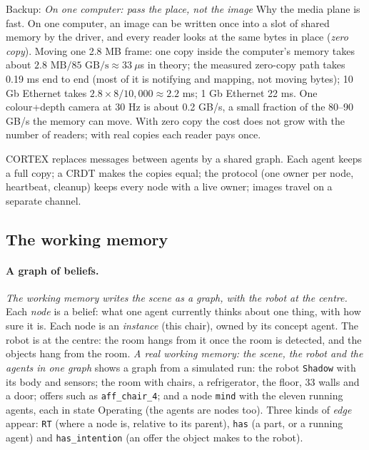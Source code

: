 \documentclass[11pt]{article}
\newcommand{\slt}[1]{\emph{#1}}   %
\begin{document}
\begin{backupbox}{Backup: \emph{On one computer: pass the place, not the image}}
Why the media plane is fast. On one computer, an image can be written once into a slot of shared memory by the driver, and every reader looks at the same bytes in place (\emph{zero copy}). Moving one 2.8 MB frame: one copy inside the computer's memory takes about $2.8\text{ MB} / 85\text{ GB/s} \approx 33\ \mu$s in theory; the measured zero-copy path takes 0.19 ms end to end (most of it is notifying and mapping, not moving bytes); 10 Gb Ethernet takes $2.8\times 8/10{,}000 \approx 2.2$ ms; 1 Gb Ethernet 22 ms. One colour+depth camera at 30 Hz is about 0.2 GB/s, a small fraction of the 80--90 GB/s the memory can move. With zero copy the cost does not grow with the number of readers; with real copies each reader pays once.
\end{backupbox}

\begin{keyidea}
CORTEX replaces messages between agents by a shared graph. Each agent keeps a full copy; a CRDT makes the copies equal; the protocol (one owner per node, heartbeat, cleanup) keeps every node with a live owner; images travel on a separate channel.
\end{keyidea}

\subsection{The working memory}

\paragraph{A graph of beliefs.} \slt{The working memory writes the scene as a graph, with the robot at the centre.} Each \emph{node} is a belief: what one agent currently thinks about one thing, with how sure it is. Each node is an \emph{instance} (this chair), owned by its concept agent. The robot is at the centre: the room hangs from it once the room is detected, and the objects hang from the room. \slt{A real working memory: the scene, the robot and the agents in one graph} shows a graph from a simulated run: the robot \texttt{Shadow} with its body and sensors; the room with chairs, a refrigerator, the floor, 33 walls and a door; offers such as \texttt{aff\_chair\_4}; and a node \texttt{mind} with the eleven running agents, each in state Operating (the agents are nodes too). Three kinds of \emph{edge} appear: \texttt{RT} (where a node is, relative to its parent), \texttt{has} (a part, or a running agent) and \texttt{has\_intention} (an offer the object makes to the robot).
\end{document}
